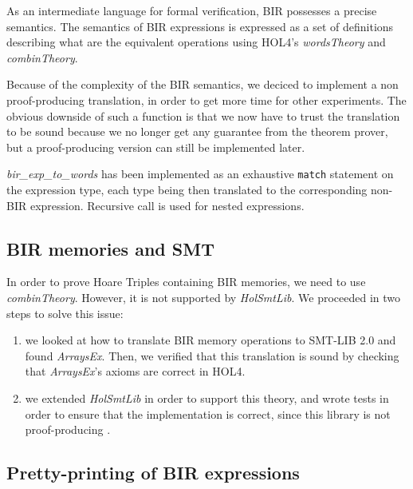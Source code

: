 \documentclass[10pt,a4paper]{article}
\begin{document}
\begin{multicols}{2}
As an intermediate language for formal verification, {BIR} possesses a precise semantics. The semantics of BIR expressions is expressed as a set of definitions describing what are the equivalent operations using HOL4's \textit{wordsTheory} and \textit{combinTheory}.

Because of the complexity of the BIR semantics, we deciced to implement a non proof-producing translation, in order to get more time for other experiments. The obvious downside of such a function is that we now have to trust the translation to be sound because we no longer get any guarantee from the theorem prover, but a proof-producing version can still be implemented later.

\textit{bir\_exp\_to\_words} has been implemented as an exhaustive \texttt{match} statement on the expression type, each type being then translated to the corresponding non-BIR expression. Recursive call is used for nested expressions.

\subsection{BIR memories and SMT} \label{bir-memories-with-smt-solvers}

In order to prove Hoare Triples containing BIR memories, we need to use \textit{combinTheory}. However, it is not supported by \textit{HolSmtLib}. We proceeded in two steps to solve this issue:

\begin{enumerate}
  \item we looked at how to translate BIR memory operations to SMT-LIB 2.0 and found \textit{ArraysEx}. Then, we verified that this translation is sound by checking that \textit{ArraysEx}'s axioms are correct in HOL4.
  \item we extended \textit{HolSmtLib} in order to support this theory, and wrote tests in order to ensure that the implementation is correct, since this library is not proof-producing \footnotemark.
\end{enumerate}


\subsection{Pretty-printing of BIR expressions} \label{pretty-printers}


\end{multicols}
\end{document}
